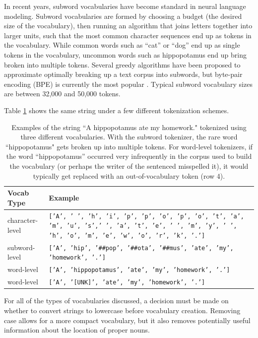 In recent years, subword vocabularies have become standard in neural language modeling.
Subword vocabularies are formed by choosing a budget (the desired size of the vocabulary), then running an algorithm that joins letters together into larger units, such that the most common character sequences end up as tokens in the vocabulary.
While common words such as ``cat'' or ``dog'' end up as single tokens in the vocabulary, uncommon words such as hippopotamus end up bring broken into multiple tokens.
Several greedy algorithms have been proposed to approximate optimally breaking up a text corpus into subwords, but byte-pair encoding (BPE) is currently the most popular \citep{sennrich2016neural}.
Typical subword vocabulary sizes are between 32,000 and 50,000 tokens.

Table \ref{tab:tokenization} shows the same string under a few different tokenization schemes.

\begin{table}[h]
    \centering
    \caption{Examples of the string ``A hippopotamus ate my homework." tokenized using three different vocabularies. With the subword tokenizer, the rare word ``hippopotamus" gets broken up into multiple tokens. For word-level tokenizers, if the word ``hippopotamus'' occurred very infrequently in the corpus used to build the vocabulary (or perhaps the writer of the sentenced misspelled it), it would typically get replaced with an out-of-vocabulary token (row 4).}
    \label{tab:tokenization}
    \begin{tabular}{l|p{5in}}
        Vocab Type & Example \\
        \hline
        character-level & \texttt{['A', ' ', 'h', 'i', 'p', 'p', 'o', 'p', 'o', 't', 'a', 'm', 'u', 's',' ', 'a', 't', 'e', ' ', 'm', 'y', ' ', 'h', 'o', 'm', 'e', 'w', 'o', 'r', 'k', '.']}\\
        subword-level & \texttt{['A', 'hip', '\#\#pop', '\#\#ota', '\#\#mus', 'ate', 'my', 'homework', '.']}\\
        word-level & \texttt{['A', 'hippopotamus', 'ate', 'my', 'homework', '.']}\\
        word-level & \texttt{['A', '[UNK]', 'ate', 'my', 'homework', '.']}\\
    \end{tabular}
\end{table}

For all of the types of vocabularies discussed, a decision must be made on whether to convert strings to lowercase before vocabulary creation.
Removing case allows for a more compact vocabulary, but it also removes potentially useful information about the location of proper nouns.

